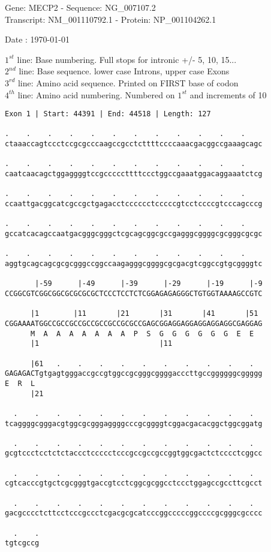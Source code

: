 \documentclass{article}
\begin{document}
\begin{center}
\begin{large}
Gene: MECP2 - Sequence: NG\_007107.2\\
Transcript: NM\_001110792.1 - Protein: NP\_001104262.1
 
 Date : \today
\end{large}
\end{center}
$1^{st}$ line: Base numbering. Full stops for intronic +/- 5, 10, 15...\\
$2^{nd}$ line: Base sequence. lower case Introns, upper case Exons\\
$3^{rd}$ line: Amino acid sequence. Printed on FIRST base of codon\\
$4^{th}$ line: Amino acid numbering. Numbered on $1^{st}$ and increments of 10\\
\begin{Verbatim}
Exon 1 | Start: 44391 | End: 44518 | Length: 127
 
.    .    .    .    .    .    .    .    .    .    .    .    
ctaaaccagtccctccgcgcccaagccgcctcttttccccaaacgacggccgaaagcagc
  
.    .    .    .    .    .    .    .    .    .    .    .    
caatcaacagctggaggggtccgcccccttttccctggccgaaatggacaggaaatctcg
  
.    .    .    .    .    .    .    .    .    .    .    .    
ccaattgacggcatcgccgctgagacctcccccctcccccgtcctccccgtcccagcccg
  
.    .    .    .    .    .    .    .    .    .    .    .    
gccatcacagccaatgacgggcgggctcgcagcggcgccgagggcggggcgcgggcgcgc
  
.    .    .    .    .    .    .    .    .    .    .    .    
aggtgcagcagcgcgcgggccggccaagagggcggggcgcgacgtcggccgtgcggggtc
  
       |-59      |-49      |-39      |-29      |-19      |-9
CCGGCGTCGGCGGCGCGCGCGCTCCCTCCTCTCGGAGAGAGGGCTGTGGTAAAAGCCGTC
  
      |1        |11       |21       |31       |41       |51 
CGGAAAATGGCCGCCGCCGCCGCCGCCGCGCCGAGCGGAGGAGGAGGAGGAGGCGAGGAG
      M  A  A  A  A  A  A  A  P  S  G  G  G  G  G  G  E  E  
      |1                            |11                     
  
      |61   .    .    .    .    .    .    .    .    .    .  
GAGAGACTgtgagtgggaccgccgtggccgcgggcggggacccttgccggggggcggggg
E  R  L                                                     
      |21                                                   
  
  .    .    .    .    .    .    .    .    .    .    .    .  
tcaggggcgggacgtggcgcgggaggggcccgcggggtcggacgacacggctggcggatg
  
  .    .    .    .    .    .    .    .    .    .    .    .  
gcgtccctcctctctaccctccccctcccgccgccgccggtggcgactctcccctcggcc
  
  .    .    .    .    .    .    .    .    .    .    .    .  
cgtcacccgtgctcgcgggtgaccgtcctcggcgcggcctccctggagccgccttcgcct
  
  .    .    .    .    .    .    .    .    .    .    .    .  
gacgcccctcttcctcccgccctcgacgcgcatcccggcccccggccccgcgggcgcccc
  
  .    .
tgtcgccg
\end{Verbatim}
\end{document}
